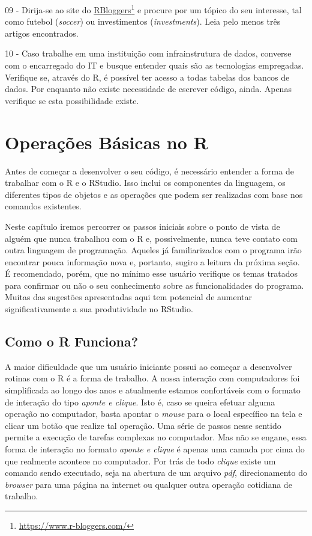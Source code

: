 \documentclass[
  11pt,
]{book}
\begin{document}
09 -
Dirija-se ao site do \href{https://www.r-bloggers.com/}{RBloggers}\footnote{\url{https://www.r-bloggers.com/}} e procure por um tópico do seu interesse, tal como futebol (\emph{soccer}) ou investimentos (\emph{investments}). Leia pelo menos três artigos encontrados.

10 -
Caso trabalhe em uma instituição com infrainstrutura de dados, converse com o encarregado do IT e busque entender quais são as tecnologias empregadas. Verifique se, através do R, é possível ter acesso a todas tabelas dos bancos de dados. Por enquanto não existe necessidade de escrever código, ainda. Apenas verifique se esta possibilidade existe.

\hypertarget{operacoes-basicas}{%
\chapter{Operações Básicas no R}\label{operacoes-basicas}}

Antes de começar a desenvolver o seu código, é necessário entender a forma de trabalhar com o R e o RStudio. Isso inclui os componentes da linguagem, os diferentes tipos de objetos e as operações que podem ser realizadas com base nos comandos existentes.

Neste capítulo iremos percorrer os passos iniciais sobre o ponto de vista de alguém que nunca trabalhou com o R e, possivelmente, nunca teve contato com outra linguagem de programação. Aqueles já familiarizados com o programa irão encontrar pouca informação nova e, portanto, sugiro a leitura da próxima seção. É recomendado, porém, que no mínimo esse usuário verifique os temas tratados para confirmar ou não o seu conhecimento sobre as funcionalidades do programa. Muitas das sugestões apresentadas aqui tem potencial de aumentar significativamente a sua produtividade no RStudio.

\hypertarget{como-o-r-funciona}{%
\section{Como o R Funciona?}\label{como-o-r-funciona}}

A maior dificuldade que um usuário iniciante possui ao começar a desenvolver rotinas com o R é a forma de trabalho. A nossa interação com computadores foi simplificada ao longo dos anos e atualmente estamos confortáveis com o formato de interação do tipo \emph{aponte e clique}. Isto é, caso se queira efetuar alguma operação no computador, basta apontar o \emph{mouse} para o local específico na tela e clicar um botão que realize tal operação. Uma série de passos nesse sentido permite a execução de tarefas complexas no computador. Mas não se engane, essa forma de interação no formato \emph{aponte e clique} é apenas uma camada por cima do que realmente acontece no computador. Por trás de todo \emph{clique} existe um comando sendo executado, seja na abertura de um arquivo \emph{pdf}, direcionamento do \emph{browser} para uma página na internet ou qualquer outra operação cotidiana de trabalho.
\end{document}
